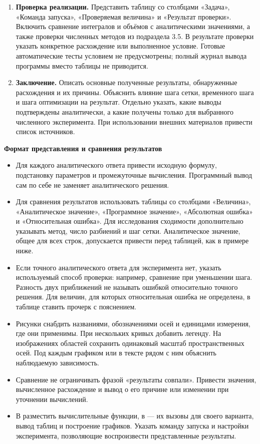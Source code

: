 \documentclass[12pt,a4paper]{article}
\newcommand{\taskhead}[1]{\par\textbf{#1}\par}
\begin{document}
\begin{enumerate}
значение задержки и историю состояния до начала моделирования.
Описать вычисление средних затрат и численного градиента,
представить исходные и найденные настройки, значения затрат,
линии уровня и траекторию оптимизации. Объяснить ограничения полученных выводов.
\item \textbf{Проверка реализации.} Представить таблицу со столбцами
«Задача», «Команда запуска», «Проверяемая величина» и «Результат проверки».
Включить сравнение интегралов и объёмов с аналитическими значениями,
а также проверки численных методов из подраздела 3.5.
В результате проверки указать конкретное расхождение или выполненное условие.
Готовые автоматические тесты условием не предусмотрены;
полный журнал вывода программы вместо таблицы не приводится.
\item \textbf{Заключение.} Описать основные полученные результаты,
обнаруженные расхождения и их причины. Объяснить влияние шага сетки,
временного шага и шага оптимизации на результат. Отдельно указать,
какие выводы подтверждены аналитически, а какие получены только
для выбранного численного эксперимента. При использовании внешних
материалов привести список источников.
\end{enumerate}

\taskhead{Формат представления и сравнения результатов}
\begin{itemize}
\item Для каждого аналитического ответа привести исходную формулу,
подстановку параметров и промежуточные вычисления.
Программный вывод сам по себе не заменяет аналитического решения.
\item Для сравнения результатов использовать таблицы со столбцами
«Величина», «Аналитическое значение», «Программное значение»,
«Абсолютная ошибка» и «Относительная ошибка».
Для исследования сходимости дополнительно указывать метод, число разбиений
и шаг сетки. Аналитическое значение, общее для всех строк,
допускается привести перед таблицей, как в примере ниже.
\item Если точного аналитического ответа для эксперимента нет,
указать используемый способ проверки: например, сравнение при уменьшении
шага. Разность двух приближений не называть ошибкой относительно точного
решения. Для величин, для которых относительная ошибка не определена,
в таблице ставить прочерк с пояснением.
\item Рисунки снабдить названиями, обозначениями осей и единицами измерения,
где они применимы. При нескольких кривых добавить легенду.
На изображениях областей сохранить одинаковый масштаб пространственных осей.
Под каждым графиком или в тексте рядом с ним объяснить наблюдаемую зависимость.
\item Сравнение не ограничивать фразой «результаты совпали».
Привести значения, вычисленное расхождение и вывод о его причине
или изменении при уточнении вычислений.
\item В  разместить вычислительные функции,
в  --- их вызовы для своего варианта, вывод таблиц
и построение графиков. Указать команду запуска и настройки эксперимента,
позволяющие воспроизвести представленные результаты.
\end{itemize}
\end{document}
